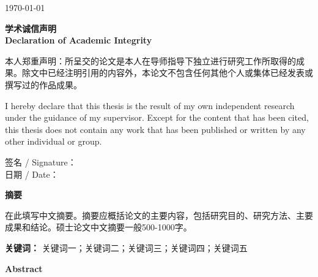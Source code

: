 \documentclass[a4paper,12pt,openright]{ctexrep}
\begin{document}
\vfill
{\large \today}

\raggedright

\newpage
\thispagestyle{empty}
\begin{center}
{\Large \textbf{学术诚信声明}}\\[0.3cm]
{\large \textbf{Declaration of Academic Integrity}}
\end{center}
\vspace{0.5cm}

本人郑重声明：所呈交的论文是本人在导师指导下独立进行研究工作所取得的成果。除文中已经注明引用的内容外，本论文不包含任何其他个人或集体已经发表或撰写过的作品成果。

\vspace{0.5cm}
I hereby declare that this thesis is the result of my own independent research under the guidance of my supervisor. Except for the content that has been cited, this thesis does not contain any work that has been published or written by any other individual or group.

\vspace{2cm}
\begin{flushright}
签名 / Signature：\underline{\hspace{5cm}}\\[12pt]
日期 / Date：\underline{\hspace{5cm}}
\end{flushright}

\newpage
\begin{center}
{\Large \textbf{摘\quad 要}}
\end{center}
\vspace{0.5cm}

在此填写中文摘要。摘要应概括论文的主要内容，包括研究目的、研究方法、主要成果和结论。硕士论文中文摘要一般500-1000字。

\vspace{1cm}
\noindent\textbf{关键词：} 关键词一；关键词二；关键词三；关键词四；关键词五

\newpage
\begin{center}
{\Large \textbf{Abstract}}
\end{center}
\vspace{0.5cm}
\end{document}
